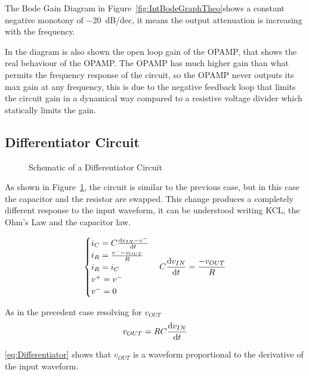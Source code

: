 \documentclass[a4paper, twocolumn]{article}
\begin{document}
The Bode Gain Diagram in Figure~\ref{fig:IntBodeGraphTheo}shows a constant negative monotony of \SI{-20}{dB/dec}, it means the output attenuation is increasing with the frequency.

In the diagram is also shown the open loop gain of the OPAMP, that shows the real behaviour of the OPAMP. The OPAMP has much higher gain than what permits the frequency response of the circuit, so the OPAMP never outputs its max gain at any frequency, this is due to the negative feedback loop that limits the circuit gain in a dynamical way compared to a resistive voltage divider which statically limits the gain.

\subsection{Differentiator Circuit} 
\label{sec:diff}

\begin{figure}
    \centering
    \def \svgwidht{\columnwidth}
    
    \caption{Schematic of a Differentiator Circuit}
    \label{fig:DifferScheme}
\end{figure}

As shown in Figure~\ref{fig:DifferScheme}, the circuit is similar to the previous case, but in this case the capacitor and the resistor are swapped. This change produces a completely different response to the input waveform, it can be understood writing KCL, the Ohm's Law and the capacitor law.

\begin{gather*}
    \begin{cases}
        i_C = C\dv{v_{IN}-v^-}{t}\\
        i_R = \frac{v^--v_{OUT}}{R}\\
        i_R = i_C\\
        v^+=v^-\\
        v^-=0
    \end{cases}
    C\dv{v_{IN}}{t}=\frac{-v_{OUT}}{R}
\end{gather*}

As in the precedent case resolving for $v_{OUT}$
\begin{equation}
\label{eq:Differentiator}
    v_{OUT}=RC\dv{v_{IN}}{t}
\end{equation}

\eqref{eq:Differentiator} shows that $v_{OUT}$ is a waveform proportional to the derivative of the input waveform. 
\end{document}
